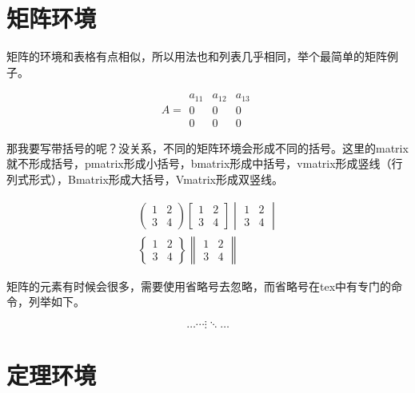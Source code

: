 \section{矩阵环境}
矩阵的环境和表格有点相似，所以用法也和列表几乎相同，举个最简单的矩阵例子。
\begin{codeshow}
\[
A=\begin{matrix}
a_{11} & a_{12} & a_{13}\\
0 & 0 & 0\\
0 & 0 & 0
\end{matrix}
\]
\end{codeshow}

那我要写带括号的呢？没关系，不同的矩阵环境会形成不同的括号。这里的matrix就不形成括号，pmatrix形成小括号，bmatrix形成中括号，vmatrix形成竖线（行列式形式），Bmatrix形成大括号，Vmatrix形成双竖线。
\begin{codeshow}
\begin{gather*}
	\begin{pmatrix}1 & 2\\
	3 & 4\end{pmatrix}
	\begin{bmatrix}1 & 2\\
	3 & 4\end{bmatrix}
	\begin{vmatrix}1 & 2\\
	3 & 4\end{vmatrix}\\
	\begin{Bmatrix}1 & 2\\
	3 & 4\end{Bmatrix}
	\begin{Vmatrix}1 & 2\\
	3 & 4\end{Vmatrix}
\end{gather*}
\end{codeshow}

矩阵的元素有时候会很多，需要使用省略号去忽略，而省略号在tex中有专门的命令，列举如下。
\begin{codeshow}
\[
\ldots \cdots \vdots \ddots \dotsc
\]
\end{codeshow}




\section{定理环境}